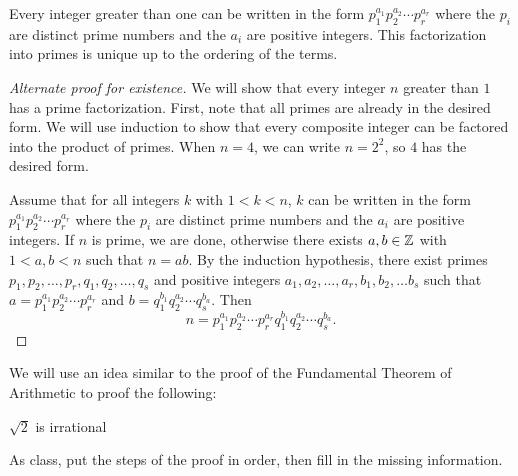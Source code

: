 \documentclass{ximera}
\begin{document}
\begin{thm}\label{FTA}
	Every integer greater than one can be written in the form $p_1^{a_1}p_2^{a_2}\cdots p_r^{a_r}$ where the $p_i$ are distinct prime numbers and the $a_i$ are positive integers. This factorization into primes is unique up to the ordering of the terms.
\end{thm}
\begin{proof}[Alternate proof for existence]
 We will show that every integer $n$ greater than $1$ has a prime factorization. First, note that all primes are already in the desired form. We will use induction to show that every composite integer can be factored into the product of primes. When $n=4$, we can write $n=2^2$, so $4$ has the desired form.
 
Assume that for all integers $k$ with $1<k<n$, $k$ can be written in the form  $p_1^{a_1}p_2^{a_2}\cdots p_r^{a_r}$ where the $p_i$ are distinct prime numbers and the $a_i$ are positive integers. If $n$ is prime, we are done, otherwise there exists $a,b\in\mathbb Z$ with $1<a,b<n$ such that $n=ab$. By the induction hypothesis, there exist primes $p_1,p_2,\dots,p_r,q_1,q_2,\dots,q_s$ and positive integers $a_1,a_2,\dots,a_r,b_1,b_2,\dots b_s$ such that $a=p_1^{a_1}p_2^{a_2}\cdots p_r^{a_r}$ and $b=q_1^{b_1}q_2^{a_2}\cdots q_s^{b_a}$. Then \[n=p_1^{a_1}p_2^{a_2}\cdots p_r^{a_r}q_1^{b_1}q_2^{a_2}\cdots q_s^{b_a}.\]
\end{proof}

We will use an idea similar to the proof of the Fundamental Theorem of Arithmetic to proof the following:

\begin{br}
	\begin{prop*}
		$\sqrt{2}$ is irrational
	\end{prop*}

	As class, put the steps of the proof in order, then fill in the missing information.
\end{br}

\end{document}
